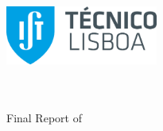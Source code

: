 
\begin{titlepage}
\includegraphics[width=5cm]{images/ist_logo}~\\[2.0cm]
\begin{center}
{\LARGE \textbf{\Title}}\\[2.5cm]
{\Large \textbf{\StudentName}}\\[2.0cm]
{\large Final Report of}\\[0.5cm]
{\LARGE \textbf{\DegreeName}}\\[1.5cm]


\end{center}
\end{titlepage}
